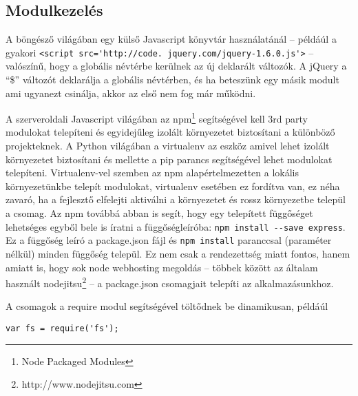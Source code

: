 \subsection{Modulkezelés}

A böngésző világában egy külső Javascript könyvtár használatánál -- példáúl a gyakori \lstinline|<script src='http://code. jquery.com/jquery-1.6.0.js'>| -- valószínű, hogy a globális névtérbe kerülnek az új deklarált változók. A jQuery a ``\$'' változót deklarálja a globális névtérben, és ha beteszünk egy másik modult ami ugyanezt csinálja, akkor az első nem fog már működni. 


A szerveroldali Javascript világában az npm\footnote{Node Packaged Modules} segítségével kell 3rd party modulokat telepíteni és egyidejűleg izolált környezetet biztosítani a különböző projekteknek. A Python világában a virtualenv az eszköz amivel lehet izolált környezetet biztosítani és mellette a pip parancs segítségével lehet modulokat telepíteni. Virtualenv-vel szemben az npm alapértelmezetten a lokális környezetünkbe telepít modulokat, virtualenv esetében ez fordítva van, ez néha zavaró, ha a fejlesztő elfelejti aktiválni a környezetet és rossz környezetbe települ a csomag.
Az npm továbbá abban is segít, hogy egy telepített függőséget lehetséges egyből bele is íratni a függőségleíróba:
\lstset{language=bash}   
\lstinline{npm install --save express}.
Ez a függőség leíró a package.json fájl és \lstinline{npm install} paranccsal (paraméter nélkül) minden függőség települ. Ez nem csak a rendezettség miatt fontos, hanem amiatt is, hogy sok node webhosting megoldás -- többek között az általam használt nodejitsu\footnote{http://www.nodejitsu.com} -- a package.json csomagjait telepíti az alkalmazásunkhoz.   

A csomagok a require modul segítségével töltődnek be dinamikusan, példáúl
\begin{lstlisting}
var fs = require('fs');
\end{lstlisting}

